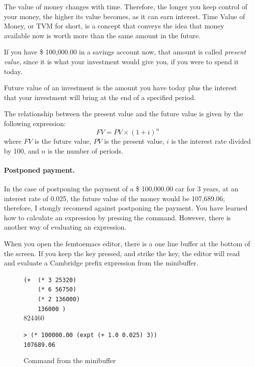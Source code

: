 \documentclass[a4paper,12pt]{book}
\newenvironment{fmpage}[1]
           {\begin{lrbox}{\fmbox}\begin{minipage}{#1}}
           {\end{minipage}\end{lrbox}\fbox{\usebox{\fmbox}}}
\begin{document}
The value of money changes with time. Therefore,
the longer you keep control of your money,
the higher its value becomes, as it can earn
interest. Time Value of Money, or TVM for short,
is a concept that conveys the idea that money
available now is worth more than the same
amount in the future.

If you have \$ 100,000.00 in a savings account
now, that amount is called {\em present value},
since it is what your investment would give you,
if you were to spend it today.

Future value of an investment is the amount
you have today plus the interest that your
investment will bring at the end of a
specified period.

The relationship between the present value
and the future value is given by the
following expression:
\begin{equation}
FV= PV\times (1+i)^n
\label{eq:future-value}
\end{equation}
where $FV$ is the future value, $PV$ is the present
value, $i$ is the interest rate divided by 100,
and $n$ is the number of periods.

\paragraph{Postponed payment.}
In the case of postponing the payment of a \$ 100,000.00 car
for 3 years, at an interest rate of 0.025, the future
value of the money would be 107,689.06; therefore,
I stongly recomend against postponing the payment.
You have learned how to calculate an expression
by pressing the \keys{~]~} command.
However, there is another way of evaluating an expression.

When you open the femtoemacs editor, there is
a one line buffer at the bottom of the screen.
If you keep the  key pressed,
and strike the   key, the editor
will read and evaluate a Cambridge prefix
expression from the minibuffer.

\begin{figure}[!h]
\begin{fmpage}{0.8\textwidth}

\verb|(+  (* 3 25320)|\\
\verb|    (* 6 56750)|\\
\verb|    (* 2 136000)|\\
\verb|    136000 )|\keys{~]~}\\ 
824460
\end{fmpage}

\begin{fmpage}{0.8\textwidth}
\verb|> (* 100000.00 (expt (+ 1.0 0.025) 3))|\\
\verb|107689.06|
\end{fmpage}
\caption{Command from the minibuffer}
\label{future-value}
\end{figure}
\end{document}
